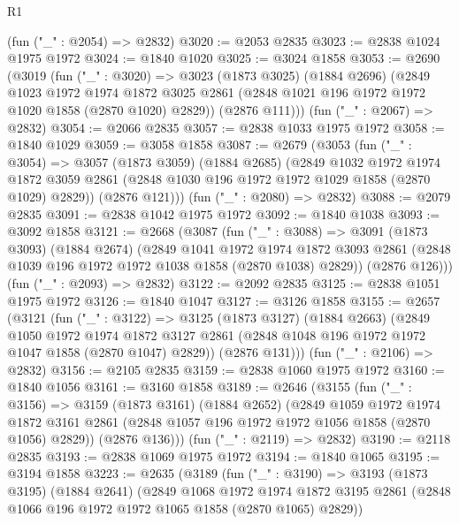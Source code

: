 \begin{lexlean}{R1}
\begin{coremodule}
    (fun ("_" : @2054) => @2832)
@3020 := @2053 @2835
@3023 := @2838 @1024 @1975 @1972
@3024 := @1840 @1020
@3025 := @3024 @1858
@3053 := @2690
    (@3019
      (fun ("_" : @3020) =>
      @3023
        (@1873 @3025)
        (@1884 @2696)
        (@2849
          @1023
          @1972
          @1974
          @1872
          @3025
          @2861
          (@2848 @1021 @196 @1972 @1972 @1020 @1858 (@2870 @1020) @2829))
        (@2876 @111)))
    (fun ("_" : @2067) => @2832)
@3054 := @2066 @2835
@3057 := @2838 @1033 @1975 @1972
@3058 := @1840 @1029
@3059 := @3058 @1858
@3087 := @2679
    (@3053
      (fun ("_" : @3054) =>
      @3057
        (@1873 @3059)
        (@1884 @2685)
        (@2849
          @1032
          @1972
          @1974
          @1872
          @3059
          @2861
          (@2848 @1030 @196 @1972 @1972 @1029 @1858 (@2870 @1029) @2829))
        (@2876 @121)))
    (fun ("_" : @2080) => @2832)
@3088 := @2079 @2835
@3091 := @2838 @1042 @1975 @1972
@3092 := @1840 @1038
@3093 := @3092 @1858
@3121 := @2668
    (@3087
      (fun ("_" : @3088) =>
      @3091
        (@1873 @3093)
        (@1884 @2674)
        (@2849
          @1041
          @1972
          @1974
          @1872
          @3093
          @2861
          (@2848 @1039 @196 @1972 @1972 @1038 @1858 (@2870 @1038) @2829))
        (@2876 @126)))
    (fun ("_" : @2093) => @2832)
@3122 := @2092 @2835
@3125 := @2838 @1051 @1975 @1972
@3126 := @1840 @1047
@3127 := @3126 @1858
@3155 := @2657
    (@3121
      (fun ("_" : @3122) =>
      @3125
        (@1873 @3127)
        (@1884 @2663)
        (@2849
          @1050
          @1972
          @1974
          @1872
          @3127
          @2861
          (@2848 @1048 @196 @1972 @1972 @1047 @1858 (@2870 @1047) @2829))
        (@2876 @131)))
    (fun ("_" : @2106) => @2832)
@3156 := @2105 @2835
@3159 := @2838 @1060 @1975 @1972
@3160 := @1840 @1056
@3161 := @3160 @1858
@3189 := @2646
    (@3155
      (fun ("_" : @3156) =>
      @3159
        (@1873 @3161)
        (@1884 @2652)
        (@2849
          @1059
          @1972
          @1974
          @1872
          @3161
          @2861
          (@2848 @1057 @196 @1972 @1972 @1056 @1858 (@2870 @1056) @2829))
        (@2876 @136)))
    (fun ("_" : @2119) => @2832)
@3190 := @2118 @2835
@3193 := @2838 @1069 @1975 @1972
@3194 := @1840 @1065
@3195 := @3194 @1858
@3223 := @2635
    (@3189
      (fun ("_" : @3190) =>
      @3193
        (@1873 @3195)
        (@1884 @2641)
        (@2849
          @1068
          @1972
          @1974
          @1872
          @3195
          @2861
          (@2848 @1066 @196 @1972 @1972 @1065 @1858 (@2870 @1065) @2829))

\end{coremodule}
\end{lexlean}
